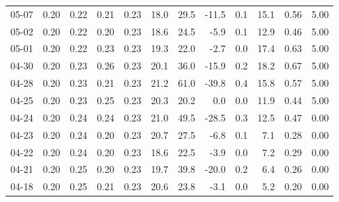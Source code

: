 \begin{threeparttable}
{\begin{tabular}{lrrrrrrrrrrr}
  05-07 &          0.20 &          0.22 &          0.21 &        0.23 &                18.0 &                29.5 &      -11.5 &                 0.1 &             15.1 &            0.56 &                   5.00 \\
  05-02 &          0.20 &          0.22 &          0.20 &        0.23 &                18.6 &                24.5 &       -5.9 &                 0.1 &             12.9 &            0.46 &                   5.00 \\
  05-01 &          0.20 &          0.22 &          0.23 &        0.23 &                19.3 &                22.0 &       -2.7 &                 0.0 &             17.4 &            0.63 &                   5.00 \\
  04-30 &          0.20 &          0.23 &          0.26 &        0.23 &                20.1 &                36.0 &      -15.9 &                 0.2 &             18.2 &            0.67 &                   5.00 \\
  04-28 &          0.20 &          0.23 &          0.21 &        0.23 &                21.2 &                61.0 &      -39.8 &                 0.4 &             15.8 &            0.57 &                   5.00 \\
  04-25 &          0.20 &          0.23 &          0.25 &        0.23 &                20.3 &                20.2 &        0.0 &                 0.0 &             11.9 &            0.44 &                   5.00 \\
  04-24 &          0.20 &          0.24 &          0.24 &        0.23 &                21.0 &                49.5 &      -28.5 &                 0.3 &             12.5 &            0.47 &                   0.00 \\
  04-23 &          0.20 &          0.24 &          0.20 &        0.23 &                20.7 &                27.5 &       -6.8 &                 0.1 &              7.1 &            0.28 &                   0.00 \\
  04-22 &          0.20 &          0.24 &          0.20 &        0.23 &                18.6 &                22.5 &       -3.9 &                 0.0 &              7.2 &            0.29 &                   0.00 \\
  04-21 &          0.20 &          0.25 &          0.20 &        0.23 &                19.7 &                39.8 &      -20.0 &                 0.2 &              6.4 &            0.26 &                   0.00 \\
  04-18 &          0.20 &          0.25 &          0.21 &        0.23 &                20.6 &                23.8 &       -3.1 &                 0.0 &              5.2 &            0.20 &                   0.00 \\

\end{tabular}}
\end{threeparttable}
